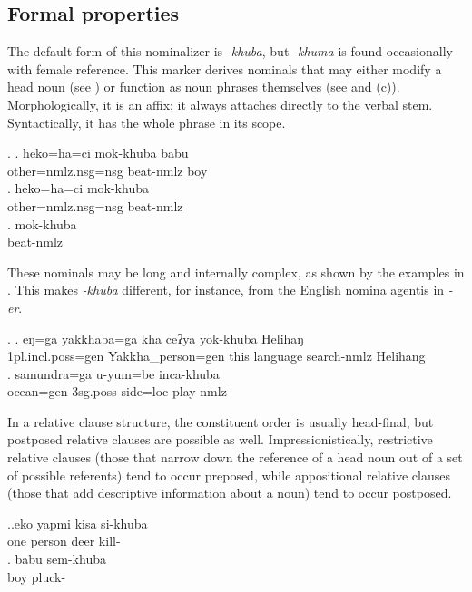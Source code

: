 \subsection{Formal properties}

The default form of this nominalizer is \emph{-khuba}, but \emph{-khuma} is found occasionally with female reference. This marker derives nominals that may either modify a head noun (see \Next[a]) or function as noun phrases themselves (see \Next[b] and (c)). Morphologically, it is an affix; it always attaches directly to the verbal stem. Syntactically, it has the whole phrase  in its scope.

\ex. \ag.   heko=ha=ci mok-khuba babu\\
			other{\sc =nmlz.nsg=nsg} beat{\sc -nmlz} boy\\
			\bg. heko=ha=ci mok-khuba \\
			other{\sc =nmlz.nsg=nsg} beat{\sc -nmlz} \\
			\bg. mok-khuba\\
			beat{\sc -nmlz}\\
	
These nominals may be long and internally complex, as shown by the examples in \Next. This makes \emph{-khuba} different, for instance, from the English nomina agentis in \emph{-er}.
	
\ex. \ag.	eŋ=ga yakkhaba=ga kha  ceʔya   yok-khuba Helihaŋ\\
		{\sc 1pl.incl.poss=gen} Yakkha\_person{\sc =gen} this language  search{\sc -nmlz}	Helihang	\\ 
		 
		\bg. samundra=ga    u-yum=be            inca-khuba\\
		ocean{\sc =gen} {\sc 3sg.poss}-side{\sc =loc} play{\sc -nmlz}\\
		 
		
In a relative clause structure, the constituent order is usually head-final, but postposed relative clauses are possible as well. Impressionistically, restrictive relative clauses (those that narrow down the reference of a head noun out of a set of possible referents) tend to occur  preposed, while appositional relative clauses (those that add descriptive information about a noun) tend to occur postposed. 
	
	\ex.\ag.eko yapmi kisa si-khuba\\
	one person deer kill-\\
	\bg. babu sem-khuba\\
	boy pluck-\\
	
